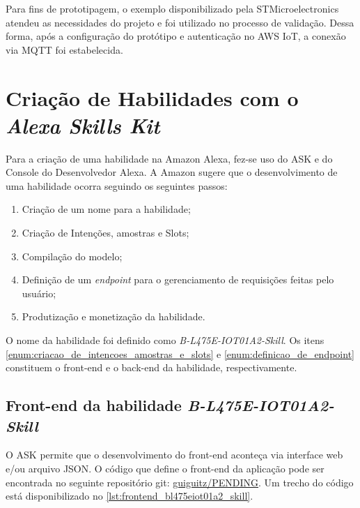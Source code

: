 Para fins de prototipagem, o exemplo disponibilizado pela STMicroelectronics atendeu as necessidades do projeto e foi utilizado no processo de validação. Dessa forma, após a configuração do protótipo e autenticação no AWS IoT, a conexão via MQTT foi estabelecida.

\section{Criação de Habilidades com o \textit{Alexa Skills Kit}}

Para a criação de uma habilidade na Amazon Alexa, fez-se uso do ASK e do Console do Desenvolvedor Alexa. A Amazon sugere que o desenvolvimento de uma habilidade ocorra seguindo os seguintes passos:

\begin{enumerate}
    \item Criação de um nome para a habilidade;
    \item Criação de Intenções, amostras e Slots;\label{enum:criacao_de_intencoes_amostras_e_slots}
    \item Compilação do modelo;
    \item Definição de um \textit{endpoint} para o gerenciamento de requisições feitas pelo usuário;\label{enum:definicao_de_endpoint}
    \item Produtização e monetização da habilidade.
\end{enumerate}

O nome da habilidade foi definido como \textit{B-L475E-IOT01A2-Skill}. Os itens \autoref{enum:criacao_de_intencoes_amostras_e_slots} e \autoref{enum:definicao_de_endpoint} constituem o front-end e o back-end da habilidade, respectivamente.

\subsection{Front-end da habilidade \textit{B-L475E-IOT01A2-Skill}}\label{subscrion:frontend_bl475eiot01a2_skill}

O ASK permite que o desenvolvimento do front-end aconteça via interface web e/ou arquivo JSON. O código que define o front-end da aplicação pode ser encontrada no seguinte repositório git: \href{https://docs.aws.amazon.com/codecommit/latest/userguide/setting-up-ide-vs.html}{guiguitz/PENDING}. Um trecho do código está disponibilizado no \autoref{lst:frontend_bl475eiot01a2_skill}.

